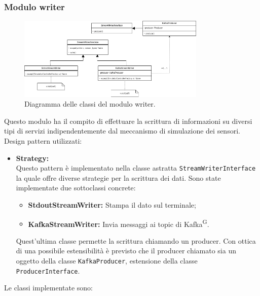 \documentclass[8pt]{article}
\newcommand{\glossterm}[1]{#1\textsuperscript{G}} %
\begin{document}
\subsubsection{Modulo writer}
\begin{figure}[h!]
    \centering
    \includegraphics[width=0.8\textwidth]{images_st/writer.png}
    \caption{Diagramma delle classi del modulo writer.}
    \label{fig:Diagramma delle classi del modulo writer}
\end{figure}
Questo modulo ha il compito di effettuare la scrittura di informazioni su diversi tipi di servizi indipendentemente dal meccanismo di simulazione dei sensori.
Design pattern utilizzati: 
\begin{itemize}
    \item \textbf{Strategy:} 
    \\Questo pattern è implementato nella classe astratta \verb|StreamWriterInterface| la quale offre diverse strategie per la scrittura dei dati. Sono state implementate due sottoclassi concrete:
    \begin{itemize}
        \item \textbf{StdoutStreamWriter:} Stampa il dato sul terminale;
        \item \textbf{KafkaStreamWriter:} Invia messaggi ai topic di \glossterm{Kafka}. 
    \end{itemize}
    Quest'ultima classe permette la scrittura chiamando un producer. Con ottica di una possibile estensibilità è previsto che il producer chiamato sia un oggetto della classe \verb|KafkaProducer|, estensione della classe \verb|ProducerInterface|.
\end{itemize}
Le classi implementate sono:
\end{document}
